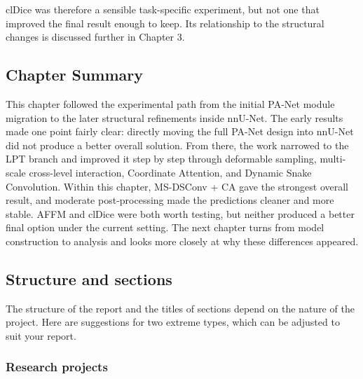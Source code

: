 \documentclass[a4paper,12pt]{article}
\begin{document}
clDice was therefore a sensible task-specific experiment, but not one that improved the final result enough to keep. Its relationship to the structural changes is discussed further in Chapter 3.

\subsection{Chapter Summary}

This chapter followed the experimental path from the initial PA-Net module migration to the later structural refinements inside nnU-Net. The early results made one point fairly clear: directly moving the full PA-Net design into nnU-Net did not produce a better overall solution. From there, the work narrowed to the LPT branch and improved it step by step through deformable sampling, multi-scale cross-level interaction, Coordinate Attention, and Dynamic Snake Convolution. Within this chapter, MS-DSConv + CA gave the strongest overall result, and moderate post-processing made the predictions cleaner and more stable. AFFM and clDice were both worth testing, but neither produced a better final option under the current setting. The next chapter turns from model construction to analysis and looks more closely at why these differences appeared.

\subsection{Structure and sections}

The structure of the report and the titles of sections depend on the nature of the project. Here are suggestions for two extreme types, which can be adjusted to suit your report.

\subsubsection{Research projects}
\end{document}
